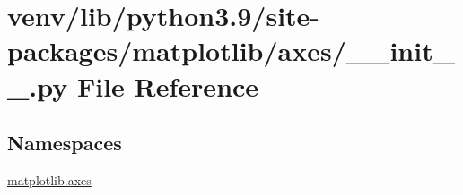 \hypertarget{venv_2lib_2python3_89_2site-packages_2matplotlib_2axes_2____init_____8py}{}\section{venv/lib/python3.9/site-\/packages/matplotlib/axes/\+\_\+\+\_\+init\+\_\+\+\_\+.py File Reference}
\label{venv_2lib_2python3_89_2site-packages_2matplotlib_2axes_2____init_____8py}
\subsection*{Namespaces}
\begin{DoxyCompactItemize}
\item 
 \hyperlink{namespacematplotlib_1_1axes}{matplotlib.\+axes}
\end{DoxyCompactItemize}
